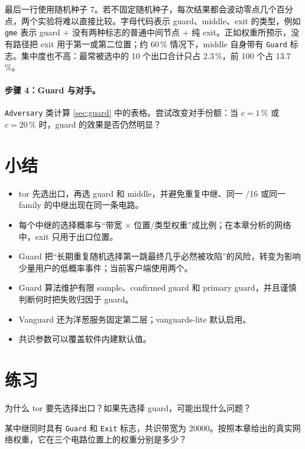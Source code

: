 最后一行使用随机种子 7。若不固定随机种子，每次结果都会波动零点几个百分点，两个实验将难以直接比较。字母代码表示 guard、middle、exit 的类型，例如 \texttt{gme} 表示 guard + 没有两种标志的普通中间节点 + 纯 exit。正如权重所预示，没有路径把 exit 用于第一或第二位置；约 60\,\% 情况下，middle 自身带有 \texttt{Guard} 标志。集中度也不高：最常被选中的 10 个出口合计只占 2.3\,\%，前 100 个占 13.7\,\%。

\paragraph{步骤 4：Guard 与对手。} \texttt{Adversary} 类计算 \cref{sec:guard} 中的表格。尝试改变对手份额：当 $c=1\,\%$ 或 $c=20\,\%$ 时，guard 的效果是否仍然明显？

\section*{小结}
\begin{itemize}
  \item tor 先选出口，再选 guard 和 middle，并避免重复中继、同一 /16 或同一 family 的中继出现在同一条电路。
  \item 每个中继的选择概率与“带宽 × 位置/类型权重”成比例；在本章分析的网络中，exit 只用于出口位置。
  \item Guard 把“长期重复随机选择第一跳最终几乎必然被攻陷”的风险，转变为影响少量用户的低概率事件；当前客户端使用两个。
  \item Guard 算法维护有限 sample、confirmed guard 和 primary guard，并且谨慎判断何时把失败归因于 guard。
  \item Vanguard 还为洋葱服务固定第二层；vanguards-lite 默认启用。
  \item 共识参数可以覆盖软件内建默认值。
\end{itemize}

\section*{练习}

\begin{esercizio}[1]\label{es:13-ordine}
为什么 tor 要先选择出口？如果先选择 guard，可能出现什么问题？
\end{esercizio}

\begin{esercizio}[1]\label{es:13-peso}
某中继同时具有 \texttt{Guard} 和 \texttt{Exit} 标志，共识带宽为 20000。按照本章给出的真实网络权重，它在三个电路位置上的权重分别是多少？
\end{esercizio}

